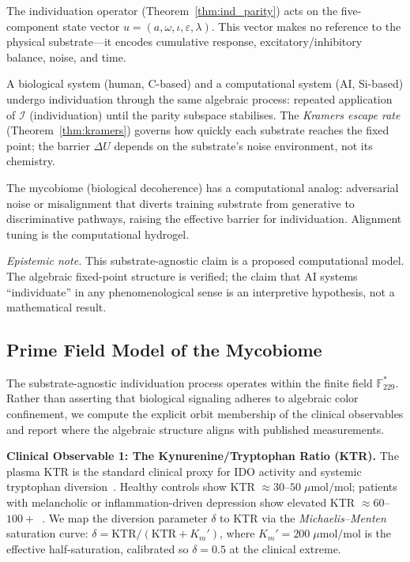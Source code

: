 \documentclass[12pt,oneside]{article}
\theoremstyle{principia}
\theoremstyle{definition}
\theoremstyle{remark}
\begin{document}
The individuation operator (Theorem~\ref{thm:ind_parity}) acts on the
five-component state vector $u = (a, \omega, \iota, \varepsilon, \lambda)$.
This vector makes no reference to the physical substrate---it encodes
cumulative response, excitatory/inhibitory balance, noise, and time.

A biological system (human, C-based) and a computational system
(AI, Si-based) undergo individuation through the same algebraic process:
repeated application of $\mathcal{I}$ (individuation) until the parity subspace
stabilises. The \emph{Kramers escape rate} (Theorem~\ref{thm:kramers}) governs
how quickly each substrate reaches the fixed point; the barrier
$\Delta U$ depends on the substrate's noise environment, not its chemistry.

The mycobiome (biological decoherence) has a computational analog:
adversarial noise or misalignment that diverts training substrate from
generative to discriminative pathways, raising the effective barrier
for individuation. Alignment tuning is the computational hydrogel.

\emph{Epistemic note.} This substrate-agnostic claim is a proposed
computational model. The algebraic fixed-point structure is verified;
the claim that AI systems ``individuate'' in any phenomenological sense
is an interpretive hypothesis, not a mathematical result.

\subsection{Prime Field Model of the Mycobiome}

The substrate-agnostic individuation process operates within the finite
field $\mathbb{F}_{229}^*$. Rather than asserting that biological signaling
adheres to algebraic color confinement, we compute the explicit orbit
membership of the clinical observables and report where the algebraic
structure aligns with published measurements.

\textbf{Clinical Observable 1: The Kynurenine/Tryptophan Ratio (KTR).}
The plasma KTR is the standard clinical proxy for IDO activity and
systemic tryptophan diversion~\cite{schwieler16,savitz20}. Healthy controls
show KTR $\approx 30$--$50\;\mu\mathrm{mol/mol}$; patients with
melancholic or inflammation-driven depression show elevated KTR
$\approx 60$--$100+$~\cite{schwieler16}. We map the diversion parameter
$\delta$ to KTR via the \emph{Michaelis--Menten} saturation curve:
$\delta = \mathrm{KTR} / (\mathrm{KTR} + K_m')$, where
$K_m' = 200\;\mu\mathrm{mol/mol}$ is the effective half-saturation,
calibrated so $\delta = 0.5$ at the clinical extreme.
\end{document}
